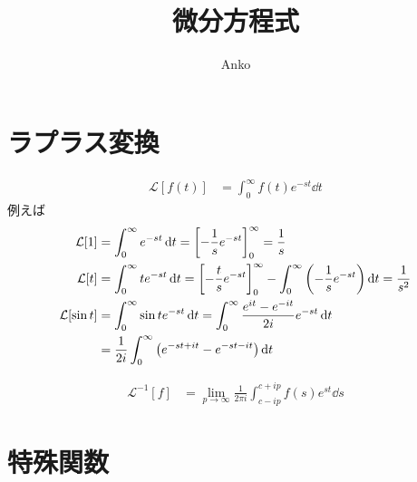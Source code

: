 \documentclass[uplatex,dvipdfmx,a4paper,11pt]{jlreq}
\title{微分方程式}
\author{Anko}
\newcommand{\LL}{\mathcal{L}}
\theoremstyle{definition}
\begin{document}
\maketitle
\tableofcontents
\clearpage

\section{ラプラス変換}

\begin{align}
  \LL[f(t)] & = \int_0^\infty f(t)e^{-st}\dd{t}
\end{align}
例えば
\begin{align}
  \LL[1]      & = \int_0^\infty e^{-st}\dd{t} = \qty[-\frac{1}{s}e^{-st}]_0^\infty = \frac{1}{s}                                                    \\
  \LL[t]      & = \int_0^\infty te^{-st}\dd{t} = \qty[-\frac{t}{s}e^{-st}]_0^\infty - \int_0^\infty \qty(-\frac{1}{s}e^{-st})\dd{t} = \frac{1}{s^2} \\
  \LL[\sin t] & = \int_0^\infty \sin te^{-st}\dd{t} = \int_0^\infty \frac{e^{it} - e^{-it}}{2i}e^{-st}\dd{t}                                        \\
              & = \frac{1}{2i}\int_0^\infty \qty(e^{-st+it} - e^{-st-it})\dd{t}
\end{align}

\begin{align}
  \LL^{-1}[f] & = \lim_{p\to\infty}\frac{1}{2\pi i}\int_{c-ip}^{c+ip}f(s)e^{st}\dd{s}
\end{align}

\section{特殊関数}
\end{document}
